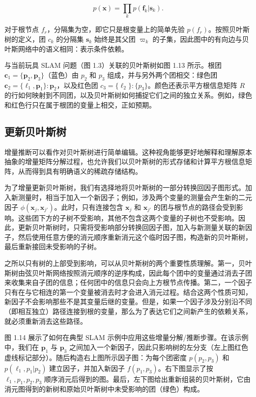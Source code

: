 \begin{equation}
p (\boldsymbol {x}) = \prod_ {k} p (\boldsymbol {f} _ {k} | \boldsymbol {s} _ {k}).\tag{1.55}
\end{equation}

对于根节点 $f_r$，分隔集为空，即它只是根变量上的简单先验 $p(f_r)$。按照贝叶斯树的定义，团 $c_k$ 的分隔集 $\pmb s_k$ 始终是其父团 $\varpi_k$ 的子集，因此图中的有向边与贝叶斯网络中的语义相同：表示条件依赖。

与当前玩具 SLAM 问题（图 1.3）关联的贝叶斯树如图 1.13 所示。根团 $\pmb c_1=\{\pmb p_2,\pmb p_3\}$（蓝色）由 $p_2$ 和 $p_3$ 组成，并与另外两个团相交：绿色团 $\pmb c_2=\{\pmb\ell_1,\pmb p_1\}:\pmb p_2$，以及红色团 $c_3=\{\ell_2\}:\{p_3\}$。颜色还表示平方根信息矩阵 $R$ 的行如何映射到不同团，以及贝叶斯树如何捕捉它们之间的独立关系。例如，绿色和红色行只在属于根团的变量上相交，正如预期。

\subsection{更新贝叶斯树}

增量推断可以看作对贝叶斯树进行简单编辑。这种视角能够更好地解释和理解原本抽象的增量矩阵分解过程，也允许我们以贝叶斯树的形式存储和计算平方根信息矩阵，从而得到具有明确语义的稀疏存储结构。

为了增量更新贝叶斯树，我们有选择地将贝叶斯树的一部分转换回因子图形式。加入新测量时，相当于加入一个新因子；例如，涉及两个变量的测量会产生新的二元因子 $\phi(\pmb x_j,\pmb x_{j'})$。此时，只有连接包含 $\pmb x_j$ 和 $\pmb x_{j'}$ 的团与根节点的路径会受到影响。这些团下方的子树不受影响，其他不包含这两个变量的子树也不受影响。因此，更新贝叶斯树时，只需将受影响部分转换回因子图，加入与新测量关联的新因子，然后使用任意方便的消元顺序重新消元这个临时因子图，构造新的贝叶斯树，最后重新接回未受影响的子树。

之所以只有树的上部受到影响，可以从贝叶斯树的两个重要性质理解。第一，贝叶斯树由弦贝叶斯网络按照消元顺序的逆序构成，因此每个团中的变量通过消去子团来收集来自子团的信息；任何团中的信息只会向上方根节点传播。第二，一个因子只有在与它相连的第一个变量被消去时才会进入消元过程。结合这两个性质可知，新因子不会影响那些不是其变量后继的变量。但是，如果一个因子涉及分别沿不同（即相互独立）路径连接到根的变量，那么为了表达它们之间新产生的依赖关系，就必须重新消去这些路径。

图 1.14 展示了如何在典型 SLAM 示例中应用这些增量分解/推断步骤。在该示例中，我们在 $\pmb p_1$ 与 $\pmb p_3$ 之间加入一个新因子，因此只影响树的左分支（左上图红色虚线标记部分）。随后构造右上图所示因子图：为每个团密度 $p(p_2,p_3)$ 和 $p(\ell_1,p_1|p_2)$ 建立因子，并加入新因子 $f(p_1,p_3)$。右下图显示了按 $\ell_1,p_1,p_2,p_3$ 顺序消元后得到的图。最后，左下图给出重新组装的贝叶斯树，它由消元图得到的新树和原始贝叶斯树中未受影响的团（绿色）构成。

